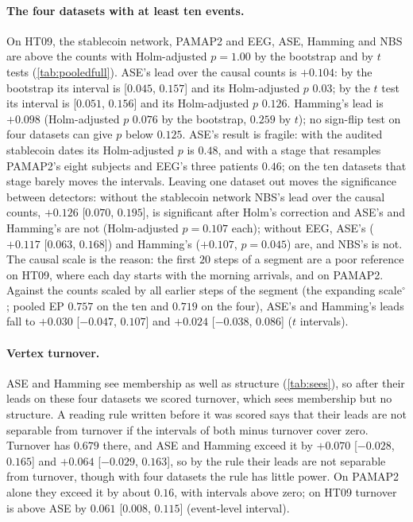 \documentclass[11pt]{article}
\theoremstyle{dsplain}
\theoremstyle{definition}
\begin{document}
\paragraph{The four datasets with at least ten events.} On HT09, the stablecoin network, PAMAP2 and EEG,
ASE, Hamming and NBS are above the counts with Holm-adjusted $p = 1.00$ by the bootstrap and by $t$ tests
(\cref{tab:pooledfull}). ASE's lead over the causal counts is $+0.104$: by the bootstrap its interval is
[$0.045$, $0.157$] and its Holm-adjusted $p$ $0.03$; by the $t$ test its interval is [$0.051$, $0.156$] and
its Holm-adjusted $p$ $0.126$. Hamming's lead is $+0.098$ (Holm-adjusted $p$ $0.076$ by the bootstrap,
$0.259$ by $t$); no sign-flip test on four datasets can give $p$ below $0.125$. ASE's result is fragile: with the audited stablecoin dates its Holm-adjusted $p$ is $0.48$,
and with a stage that resamples PAMAP2's eight subjects and EEG's three patients $0.46$; on the ten
datasets that stage barely moves the intervals. Leaving one dataset out moves the significance between detectors: without the
stablecoin network NBS's lead over the causal counts, $+0.126$ [$0.070$, $0.195$], is significant after
Holm's correction and ASE's and Hamming's are not (Holm-adjusted $p = 0.107$ each); without EEG, ASE's ($+0.117$ [$0.063$,
$0.168$]) and Hamming's ($+0.107$, $p = 0.045$) are, and NBS's is not. The causal scale is the reason: the first $20$ steps of a
segment are a poor reference on HT09, where each day starts with the morning arrivals, and on PAMAP2.
Against the counts scaled by all earlier steps of the segment (the expanding scale$^\circ$; pooled EP
$0.757$ on the ten and $0.719$ on the four), ASE's and Hamming's leads fall to $+0.030$ [$-0.047$, $0.107$]
and $+0.024$ [$-0.038$, $0.086$] ($t$ intervals).

\paragraph{Vertex turnover.} ASE and Hamming see membership as well as structure (\cref{tab:sees}), so after
their leads on these four datasets we scored turnover, which sees membership but no structure. A reading
rule written before it was scored says that their leads are not separable from turnover if the intervals of
both minus turnover cover zero. Turnover has $0.679$ there, and ASE and Hamming exceed it by $+0.070$
[$-0.028$, $0.165$] and $+0.064$ [$-0.029$, $0.163$], so by the rule their leads are not separable from
turnover, though with four datasets the rule has little power. On PAMAP2 alone they exceed it by about
$0.16$, with intervals above zero; on HT09 turnover is above ASE by $0.061$ [$0.008$, $0.115$] (event-level
interval).
\end{document}
